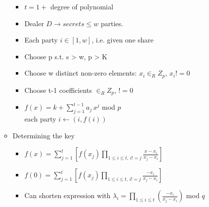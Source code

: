 \begin{itemize}
\begin{itemize}
\begin{itemize}
        \item $t = 1 +$ degree of polynomial
        \item Dealer $D \rightarrow secrets \le w$ parties.
        \item Each party $i \in [1,w]$, i.e. given one share
        \item Choose p s.t. s > w, p > K
        \item Choose w distinct non-zero elements: $x_i \in_R Z_p$, $x_i != 0$
        \item Choose t-1 coefficients $\in_R Z_p$, $!=0$
        \item $f(x) = k + \sum_{j=1}^{t-1}a_j\,x^j$ mod $p$
            \\each party $i \leftarrow (i, f(i))$
        \end{itemize}
    \item Determining the key
        \begin{itemize}
        \item $f(x) = \sum_{j=1}^t[f(x_j) \prod_{1\le i \le t,\,i != j} \frac{x-x_i}{x_j-x_i}]$
        \item $f(0) = \sum_{j=1}^t[f(x_j) \prod_{1\le i \le t,\,i != j} \frac{-x_i}{x_j-x_i}]$
        \item Can shorten expression with $\lambda_i = \prod_{1 \le i \le t}(\frac{-x_i}{x_j-x_i})$ mod $q$
        \end{itemize}
    \end{itemize}
\end{itemize}